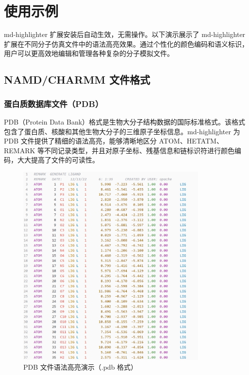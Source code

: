 
\section{使用示例}

md-highlighter 扩展安装后自动生效，无需操作。以下演示展示了 md-highlighter 扩展在不同分子仿真文件中的语法高亮效果。通过个性化的颜色编码和语义标识，用户可以更高效地编辑和管理各种复杂的分子模拟文件。

\subsection{NAMD/CHARMM 文件格式}

\subsubsection{蛋白质数据库文件（PDB）}

PDB（Protein Data Bank）格式是生物大分子结构数据的国际标准格式。该格式包含了蛋白质、核酸和其他生物大分子的三维原子坐标信息。md-highlighter 为 PDB 文件提供了精细的语法高亮，能够清晰地区分 ATOM、HETATM、REMARK 等不同记录类型，并且对原子坐标、残基信息和链标识符进行颜色编码，大大提高了文件的可读性。

\begin{figure}[!h]
    \centering
    \includegraphics[width=0.85\textwidth]{../images/pdb.png}
    \caption{PDB 文件语法高亮演示（.pdb 格式）}
    \label{fig:pdb-highlighting}
\end{figure}

